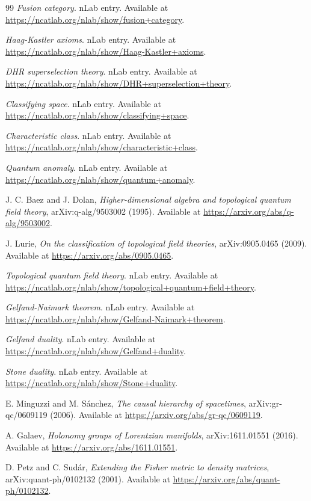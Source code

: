 \documentclass[11pt,letterpaper]{article}
\theoremstyle{definition}
\theoremstyle{remark}
\begin{document}
\begin{thebibliography}{99}
\emph{Fusion category}. nLab entry. Available at \url{https://ncatlab.org/nlab/show/fusion+category}.

\emph{Haag-Kastler axioms}. nLab entry. Available at \url{https://ncatlab.org/nlab/show/Haag-Kastler+axioms}.

\emph{DHR superselection theory}. nLab entry. Available at \url{https://ncatlab.org/nlab/show/DHR+superselection+theory}.

\emph{Classifying space}. nLab entry. Available at \url{https://ncatlab.org/nlab/show/classifying+space}.

\emph{Characteristic class}. nLab entry. Available at \url{https://ncatlab.org/nlab/show/characteristic+class}.

\emph{Quantum anomaly}. nLab entry. Available at \url{https://ncatlab.org/nlab/show/quantum+anomaly}.

J. C. Baez and J. Dolan, \emph{Higher-dimensional algebra and topological quantum field theory}, arXiv:q-alg/9503002 (1995). Available at \url{https://arxiv.org/abs/q-alg/9503002}.

J. Lurie, \emph{On the classification of topological field theories}, arXiv:0905.0465 (2009). Available at \url{https://arxiv.org/abs/0905.0465}.

\emph{Topological quantum field theory}. nLab entry. Available at \url{https://ncatlab.org/nlab/show/topological+quantum+field+theory}.

\emph{Gelfand-Naimark theorem}. nLab entry. Available at \url{https://ncatlab.org/nlab/show/Gelfand-Naimark+theorem}.

\emph{Gelfand duality}. nLab entry. Available at \url{https://ncatlab.org/nlab/show/Gelfand+duality}.

\emph{Stone duality}. nLab entry. Available at \url{https://ncatlab.org/nlab/show/Stone+duality}.

E. Minguzzi and M. S\'{a}nchez, \emph{The causal hierarchy of spacetimes}, arXiv:gr-qc/0609119 (2006). Available at \url{https://arxiv.org/abs/gr-qc/0609119}.

A. Galaev, \emph{Holonomy groups of Lorentzian manifolds}, arXiv:1611.01551 (2016). Available at \url{https://arxiv.org/abs/1611.01551}.

D. Petz and C. Sud\'{a}r, \emph{Extending the Fisher metric to density matrices}, arXiv:quant-ph/0102132 (2001). Available at \url{https://arxiv.org/abs/quant-ph/0102132}.


\end{thebibliography}
\end{document}
